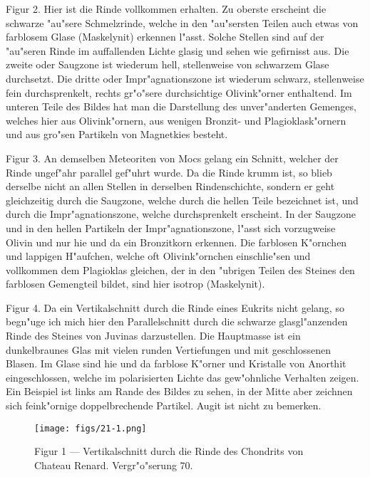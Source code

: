 \documentclass[a4paper, 11pt, oneside, polutonikogreek, german]{article}
\begin{document}
Figur 2. Hier ist die Rinde vollkommen erhalten. Zu oberste erscheint die schwarze "au"sere Schmelzrinde, welche in den "au"sersten Teilen auch etwas von farblosem Glase (Maskelynit) erkennen l"asst. Solche Stellen sind auf der "au"seren Rinde im auffallenden Lichte glasig und sehen wie gefirnisst aus. Die zweite oder Saugzone ist wiederum hell, stellenweise von schwarzem Glase durchsetzt. Die dritte oder Impr"agnationszone ist wiederum schwarz, stellenweise fein durchsprenkelt, rechts gr"o"sere durchsichtige Olivink"orner enthaltend. Im unteren Teile des Bildes hat man die Darstellung des unver"anderten Gemenges, welches hier aus Olivink"ornern, aus wenigen Bronzit- und Plagioklask"ornern und aus gro"sen Partikeln von Magnetkies besteht.

Figur 3. An demselben Meteoriten von Mocs gelang ein Schnitt, welcher der Rinde ungef"ahr parallel gef"uhrt wurde. Da die Rinde krumm ist, so blieb derselbe nicht an allen Stellen in derselben Rindenschichte, sondern er geht gleichzeitig durch die Saugzone, welche durch die hellen Teile bezeichnet ist, und durch die Impr"agnationszone, welche durchsprenkelt erscheint. In der Saugzone und in den hellen Partikeln der Impr"agnationszone, l"asst sich vorzugweise Olivin und nur hie und da ein Bronzitkorn erkennen. Die farblosen K"ornchen und lappigen H"aufchen, welche oft Olivink"ornchen einschlie"sen und vollkommen dem Plagioklas gleichen, der in den "ubrigen Teilen des Steines den farblosen Gemengteil bildet, sind hier isotrop (Maskelynit).

Figur 4. Da ein Vertikalschnitt durch die Rinde eines Eukrits nicht gelang, so begn"uge ich mich hier den Parallelschnitt durch die schwarze glasgl"anzenden Rinde des Steines von Juvinas darzustellen. Die Hauptmasse ist ein dunkelbraunes Glas mit vielen runden Vertiefungen und mit geschlossenen Blasen. Im Glase sind hie und da farblose K"orner und Kristalle von Anorthit eingeschlossen, welche im polarisierten Lichte das gew"ohnliche Verhalten zeigen. Ein Beispiel ist links am Rande des Bildes zu sehen, in der Mitte aber zeichnen sich feink"ornige doppelbrechende Partikel. Augit ist nicht zu bemerken.
\clearpage

\vspace*{\fill}
\begin{figure}[H]
\centering
\texttt{[image: figs/21-1.png]}
\caption{\small Figur 1 --- Vertikalschnitt durch die Rinde des Chondrits von Chateau Renard. Vergr"o"serung 70.}
\end{figure}
\vspace*{\fill}
\clearpage
\end{document}
